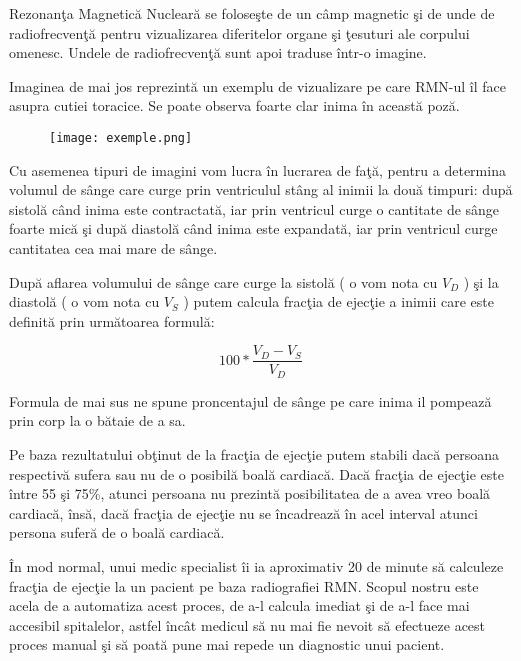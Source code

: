 Rezonan\c{t}a Magnetic\u{a} Nuclear\u{a} se folose\c{s}te de un c\^{a}mp magnetic \c{s}i de unde de radiofrecven\c{t}\u{a} pentru vizualizarea diferitelor organe \c{s}i \c{t}esuturi ale corpului omenesc. Undele de radiofrecven\c{t}\u{a} sunt apoi traduse \^{i}ntr-o imagine.
\par
Imaginea de mai jos reprezint\u{a} un exemplu de vizualizare pe care RMN-ul \^{i}l face asupra cutiei toracice. Se poate observa foarte clar inima \^{i}n aceast\u{a} poz\u{a}.

\begin{figure}[h!]
  \centering
  \texttt{[image: exemple.png]}
\end{figure}

Cu asemenea tipuri de imagini vom lucra \^{i}n lucrarea de fa\c{t}\u{a}, pentru a determina volumul de s\^{a}nge care curge prin ventriculul st\^{a}ng al inimii la dou\u{a} timpuri: dup\u{a} sistol\u{a} c\^{a}nd inima este contractat\u{a}, iar prin ventricul curge o cantitate de s\^{a}nge foarte mic\u{a} \c{s}i dup\u{a} diastol\u{a} c\^{a}nd inima este expandat\u{a}, iar prin ventricul curge cantitatea cea mai mare de s\^{a}nge.
\par
Dup\u{a} aflarea volumului de s\^{a}nge care curge la sistol\u{a} ( o vom nota cu \textbf{\textit{$V_D$}} ) \c{s}i la diastol\u{a} ( o vom nota cu \textbf{\textit{$V_S$}} ) putem calcula frac\c{t}ia de ejec\c{t}ie a inimii care este definit\u{a} prin urm\u{a}toarea formul\u{a}:

$$100 * \frac{V_D - V_S}{V_D}$$

Formula de mai sus ne spune proncentajul de s\^{a}nge pe care inima il pompeaz\u{a} prin corp la o b\u{a}taie de a sa.
\par
Pe baza rezultatului ob\c{t}inut de la frac\c{t}ia de ejec\c{t}ie putem stabili dac\u{a} persoana respectiv\u{a} sufera sau nu de o posibil\u{a} boal\u{a} cardiac\u{a}. Dac\u{a} frac\c{t}ia de ejec\c{t}ie este \^{i}ntre 55 \c{s}i 75\%, atunci persoana nu prezint\u{a} posibilitatea de a avea vreo boal\u{a} cardiac\u{a}, \^{i}ns\u{a}, dac\u{a} frac\c{t}ia de ejec\c{t}ie nu se \^{i}ncadreaz\u{a} \^{i}n acel interval atunci persona sufer\u{a} de o boal\u{a} cardiac\u{a}.
\par
\^{I}n mod normal, unui medic specialist \^{i}i ia aproximativ 20 de minute s\u{a} calculeze frac\c{t}ia de ejec\c{t}ie la un pacient pe baza radiografiei RMN. Scopul nostru este acela de a automatiza acest proces, de a-l calcula imediat \c{s}i de a-l face mai accesibil spitalelor, astfel \^{i}nc\^{a}t medicul s\u{a} nu mai fie nevoit s\u{a} efectueze acest proces manual \c{s}i s\u{a} poat\u{a} pune mai repede un diagnostic unui pacient.

